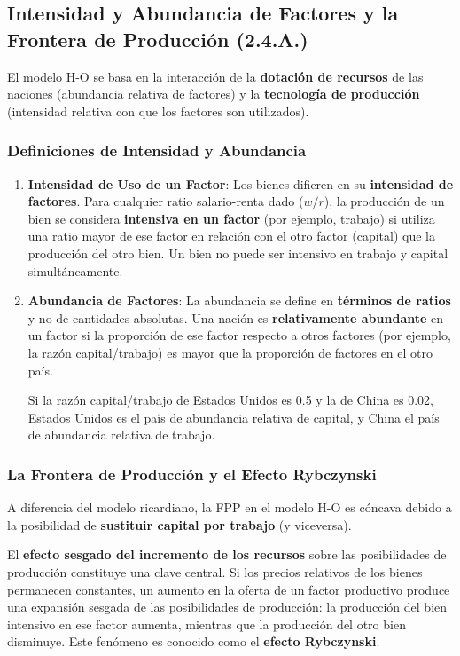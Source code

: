 \subsection{Intensidad y Abundancia de Factores y la Frontera de Producción (2.4.A.)}

El modelo H-O se basa en la interacción de la \textbf{dotación de recursos} de las naciones (abundancia relativa de factores) y la \textbf{tecnología de producción} (intensidad relativa con que los factores son utilizados).

\subsubsection{Definiciones de Intensidad y Abundancia}
\begin{enumerate}
    \item \textbf{Intensidad de Uso de un Factor}: Los bienes difieren en su \textbf{intensidad de factores}. Para cualquier ratio salario-renta dado ($w/r$), la producción de un bien se considera \textbf{intensiva en un factor} (por ejemplo, trabajo) si utiliza una ratio mayor de ese factor en relación con el otro factor (capital) que la producción del otro bien. Un bien no puede ser intensivo en trabajo y capital simultáneamente.
    \item \textbf{Abundancia de Factores}: La abundancia se define en \textbf{términos de ratios} y no de cantidades absolutas. Una nación es \textbf{relativamente abundante} en un factor si la proporción de ese factor respecto a otros factores (por ejemplo, la razón capital/trabajo) es mayor que la proporción de factores en el otro país.
    \begin{ejemplo}
    Si la razón capital/trabajo de Estados Unidos es 0.5 y la de China es 0.02, Estados Unidos es el país de abundancia relativa de capital, y China el país de abundancia relativa de trabajo.
    \end{ejemplo}
\end{enumerate}

\subsubsection{La Frontera de Producción y el Efecto Rybczynski}
A diferencia del modelo ricardiano, la FPP en el modelo H-O es cóncava debido a la posibilidad de \textbf{sustituir capital por trabajo} (y viceversa).

El \textbf{efecto sesgado del incremento de los recursos} sobre las posibilidades de producción constituye una clave central. Si los precios relativos de los bienes permanecen constantes, un aumento en la oferta de un factor productivo produce una expansión sesgada de las posibilidades de producción: la producción del bien intensivo en ese factor aumenta, mientras que la producción del otro bien disminuye. Este fenómeno es conocido como el \textbf{efecto Rybczynski}.

